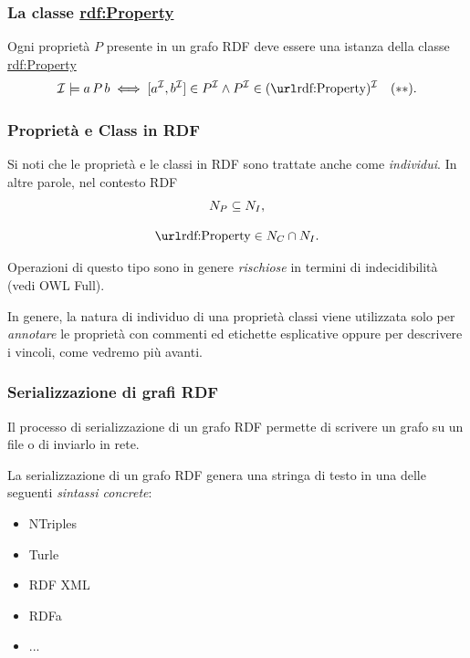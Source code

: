 \documentclass[8pt]{beamer}
\begin{document}
\begin{frame}
 \frametitle{La classe \url{rdf:Property}}
Ogni propriet\`a $P$ presente in un grafo RDF deve essere una
istanza della classe \url{rdf:Property} 
\[
  \I \models a\,P\,b \iff [a^{\I}, b^{\I}] \in P^{\I} \wedge P^{\I} \in
  (\mathurl{rdf:Property})^{\I} \quad (**).
\]

\end{frame} 

\begin{frame}
 \frametitle{Propriet\`a e Class in RDF}
 Si noti che le propriet\`a e le classi in RDF sono trattate anche come
 \emph{individui}. In altre parole, nel contesto RDF
 \[
 \begin{array}{c}
  \PNames \subseteq \INames ,\\
  \\
  \mathurl{rdf:Property} \in \CNames \cap \INames . 
 \end{array}
 \]
 \vspace{\baselineskip}
 
 Operazioni di questo tipo sono in genere \emph{rischiose} in termini 
 di indecidibilit\`a (vedi OWL Full).   
 \vspace{\baselineskip}

 In genere, la natura di individuo di una propriet\`a classi viene
 utilizzata solo  per \emph{annotare} le propriet\`a con commenti ed etichette
 esplicative oppure per descrivere i vincoli, come vedremo più avanti.
\end{frame} 

% 
\begin{frame}
 \frametitle{Serializzazione di grafi RDF}
 
 Il processo di serializzazione di un grafo RDF permette
 di scrivere un grafo su un file o di inviarlo in rete.
 \vspace{\baselineskip}
 
 La serializzazione di un grafo RDF genera una stringa di testo
 in una delle seguenti \emph{sintassi concrete}:
 \begin{itemize}
  \item NTriples
  \item Turle
  \item RDF XML
  \item RDFa
  \item ...
 \end{itemize}
\end{frame} 
\end{document}

